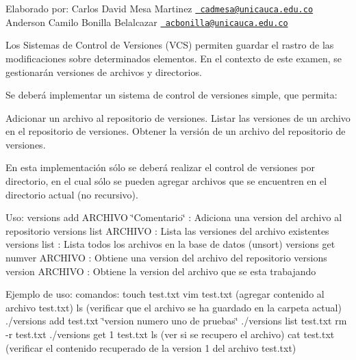 Elaborado por\+: Carlos David Mesa Martinez \href{mailto:cadmesa@unicauca.edu.co}{\texttt{ cadmesa@unicauca.\+edu.\+co}} Anderson Camilo Bonilla Belalcazar \href{mailto:acbonilla@unicauca.edu.co}{\texttt{ acbonilla@unicauca.\+edu.\+co}}

Los Sistemas de Control de Versiones (V\+CS) permiten guardar el rastro de las modificaciones sobre determinados elementos. En el contexto de este examen, se gestionarán versiones de archivos y directorios.

Se deberá implementar un sistema de control de versiones simple, que permita\+:

Adicionar un archivo al repositorio de versiones. Listar las versiones de un archivo en el repositorio de versiones. Obtener la versión de un archivo del repositorio de versiones.

En esta implementación sólo se deberá realizar el control de versiones por directorio, en el cual sólo se pueden agregar archivos que se encuentren en el directorio actual (no recursivo).

Uso\+: versions add A\+R\+C\+H\+I\+VO \char`\"{}\+Comentario\char`\"{} \+: Adiciona una version del archivo al repositorio versions list A\+R\+C\+H\+I\+VO \+: Lista las versiones del archivo existentes versions list \+: Lista todos los archivos en la base de datos (unsort) versions get numver A\+R\+C\+H\+I\+VO \+: Obtiene una version del archivo del repositorio versions version A\+R\+C\+H\+I\+VO \+: Obtiene la version del archivo que se esta trabajando

Ejemplo de uso\+: comandos\+: touch test.\+txt vim test.\+txt (agregar contenido al archivo test.\+txt) ls (verificar que el archivo se ha guardado en la carpeta actual) ./versions add test.\+txt \char`\"{}version numero uno de pruebas\char`\"{} ./versions list test.\+txt rm -\/r test.\+txt ./versions get 1 test.\+txt ls (ver si se recupero el archivo) cat test.\+txt (verificar el contenido recuperado de la version 1 del archivo test.\+txt) 